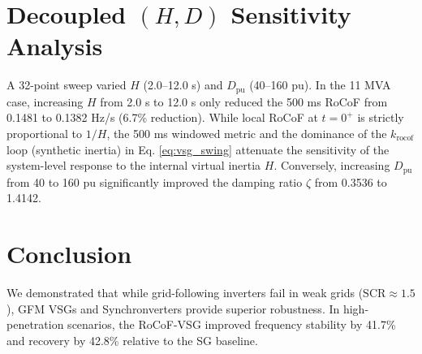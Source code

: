 \documentclass[conference]{IEEEtran}
\begin{document}
\section{Decoupled $(H, D)$ Sensitivity Analysis}\label{sec:sensitivity}

A 32-point sweep varied $H$ (2.0--12.0 s) and $D_{\text{pu}}$ (40--160 pu). In the 11 MVA case, increasing $H$ from 2.0 s to 12.0 s only reduced the 500 ms RoCoF from 0.1481 to 0.1382 Hz/s (6.7\% reduction). While local RoCoF at $t=0^+$ is strictly proportional to $1/H$, the 500 ms windowed metric and the dominance of the $k_{\text{rocof}}$ loop (synthetic inertia) in Eq. \ref{eq:vsg_swing} attenuate the sensitivity of the system-level response to the internal virtual inertia $H$. Conversely, increasing $D_{\text{pu}}$ from 40 to 160 pu significantly improved the damping ratio $\zeta$ from 0.3536 to 1.4142.

\section{Conclusion}\label{sec:conclusion}
We demonstrated that while grid-following inverters fail in weak grids ($\text{SCR} \approx 1.5$), GFM VSGs and Synchronverters provide superior robustness. In high-penetration scenarios, the RoCoF-VSG improved frequency stability by 41.7\% and recovery by 42.8\% relative to the SG baseline.



\end{document}
